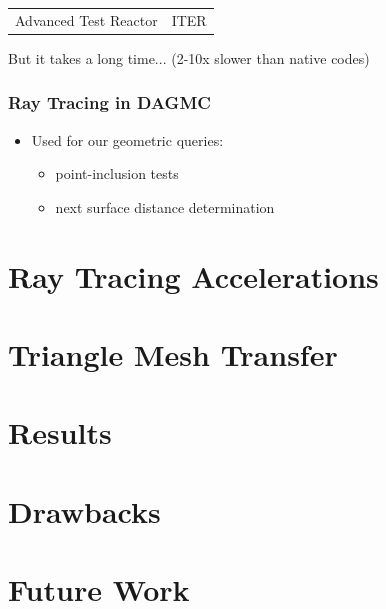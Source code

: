 \documentclass[12pt]{beamer}
\begin{document}
\begin{frame}
\begin{center}
\begin{tabular}{c c}
Advanced Test Reactor &

ITER \\
\end{tabular}
\end{center}

But it takes a long time... (2-10x slower than native codes)

\end{frame}

\begin{frame}

\frametitle{Ray Tracing in DAGMC}

\begin{itemize}
  \item Used for our geometric queries:
    \begin{itemize}
      \item point-inclusion tests
      \item next surface distance determination
    \end{itemize}
\end{itemize}


\end{frame}
\section{Ray Tracing Accelerations} %
\section{Triangle Mesh Transfer} %
\section{Results} %
\section{Drawbacks} %
\section{Future Work} %

\begin{frame}

\end{frame}

\end{document}
